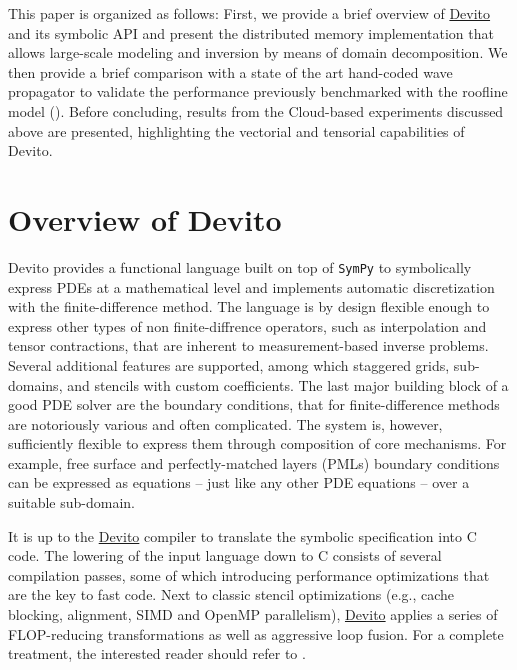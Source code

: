 \documentclass[conference]{IEEEtran}
\begin{document}
This paper is organized as follows: First, we provide a brief overview
of \href{https://github.com/devitocodes/devito}{Devito} and its symbolic
API and present the distributed memory implementation that allows
large-scale modeling and inversion by means of domain decomposition. We
then provide a brief comparison with a state of the art hand-coded wave
propagator to validate the performance previously benchmarked with the
roofline model
(\cite{patterson, devito-compiler, devito-api, louboutin2016ppf}).
Before concluding, results from the Cloud-based experiments discussed
above are presented, highlighting the vectorial and tensorial
capabilities of Devito.

\section{Overview of Devito}\label{overview-of-devito}

Devito \cite{devito-api} provides a functional language built on top of
\texttt{SymPy} \cite{sympy} to symbolically express PDEs at a
mathematical level and implements automatic discretization with the
finite-difference method. The language is by design flexible enough to
express other types of non finite-diffrence operators, such as
interpolation and tensor contractions, that are inherent to
measurement-based inverse problems. Several additional features are
supported, among which staggered grids, sub-domains, and stencils with
custom coefficients. The last major building block of a good PDE solver
are the boundary conditions, that for finite-difference methods are
notoriously various and often complicated. The system is, however,
sufficiently flexible to express them through composition of core
mechanisms. For example, free surface and perfectly-matched layers
(PMLs) boundary conditions can be expressed as equations -- just like
any other PDE equations -- over a suitable sub-domain.

It is up to the \href{https://github.com/devitocodes/devito}{Devito}
compiler to translate the symbolic specification into C code. The
lowering of the input language down to C consists of several compilation
passes, some of which introducing performance optimizations that are the
key to fast code. Next to classic stencil optimizations (e.g., cache
blocking, alignment, SIMD and OpenMP parallelism),
\href{https://github.com/devitocodes/devito}{Devito} applies a series of
FLOP-reducing transformations as well as aggressive loop fusion. For a
complete treatment, the interested reader should refer to
\cite{devito-compiler}.
\end{document}
